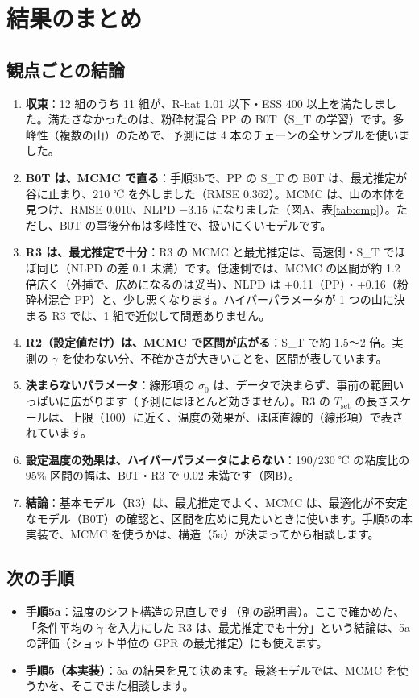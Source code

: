 \documentclass[paper=a4paper,fontsize=10.5pt,line_length=44zw,number_of_lines=38]{jlreq}
\newcommand{\gd}{\dot{\gamma}}
\newcommand{\Tset}{T_{\mathrm{set}}}
\newenvironment{points}{\begin{itemize}[label=$\triangleright$,leftmargin=1.5\zw,itemsep=0.3ex,topsep=0.5ex,parsep=0pt]}{\end{itemize}}
\newcommand{\pt}[1]{\item \textbf{#1}：}
\begin{document}
\section{結果のまとめ}

\subsection{観点ごとの結論}
\begin{enumerate}[itemsep=0.6ex,topsep=0.6ex]
\item \textbf{収束}：12 組のうち 11 組が、R-hat 1.01 以下・ESS 400 以上を満たしました。満たさなかったのは、粉砕材混合 PP の B0T（S\_T の学習）です。多峰性（複数の山）のためで、予測には 4 本のチェーンの全サンプルを使いました。
\item \textbf{B0T は、MCMC で直る}：手順3bで、PP の S\_T の B0T は、最尤推定が谷に止まり、210 ℃ を外しました（RMSE 0.362）。MCMC は、山の本体を見つけ、RMSE 0.010、NLPD $-3.15$ になりました（図A、表\ref{tab:cmp}）。ただし、B0T の事後分布は多峰性で、扱いにくいモデルです。
\item \textbf{R3 は、最尤推定で十分}：R3 の MCMC と最尤推定は、高速側・S\_T でほぼ同じ（NLPD の差 0.1 未満）です。低速側では、MCMC の区間が約 1.2 倍広く（外挿で、広めになるのは妥当）、NLPD は +0.11（PP）・+0.16（粉砕材混合 PP）と、少し悪くなります。ハイパーパラメータが 1 つの山に決まる R3 では、1 組で近似して問題ありません。
\item \textbf{R2（設定値だけ）は、MCMC で区間が広がる}：S\_T で約 1.5〜2 倍。実測の $\gd$ を使わない分、不確かさが大きいことを、区間が表しています。
\item \textbf{決まらないパラメータ}：線形項の $\sigma_0$ は、データで決まらず、事前の範囲いっぱいに広がります（予測にはほとんど効きません）。R3 の $\Tset$ の長さスケールは、上限（100）に近く、温度の効果が、ほぼ直線的（線形項）で表されています。
\item \textbf{設定温度の効果は、ハイパーパラメータによらない}：190/230 ℃ の粘度比の 95\% 区間の幅は、B0T・R3 で 0.02 未満です（図B）。
\item \textbf{結論}：基本モデル（R3）は、最尤推定でよく、MCMC は、最適化が不安定なモデル（B0T）の確認と、区間を広めに見たいときに使います。手順5の本実装で、MCMC を使うかは、構造（5a）が決まってから相談します。
\end{enumerate}

\subsection{次の手順}
\begin{points}
\pt{手順5a}温度のシフト構造の見直しです（別の説明書）。ここで確かめた、「条件平均の $\gd$ を入力にした R3 は、最尤推定でも十分」という結論は、5a の評価（ショット単位の GPR の最尤推定）にも使えます。
\pt{手順5（本実装）}5a の結果を見て決めます。最終モデルでは、MCMC を使うかを、そこでまた相談します。
\end{points}
\end{document}
